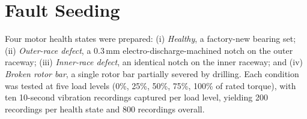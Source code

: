 \section{Fault Seeding}
Four motor health states were prepared: (i) \emph{Healthy}, a factory-new bearing set; (ii)
\emph{Outer-race defect}, a 0.3\,mm electro-discharge-machined notch on the outer raceway; (iii)
\emph{Inner-race defect}, an identical notch on the inner raceway; and (iv) \emph{Broken rotor
bar}, a single rotor bar partially severed by drilling. Each condition was tested at five load
levels (0\%, 25\%, 50\%, 75\%, 100\% of rated torque), with ten 10-second vibration recordings
captured per load level, yielding 200 recordings per health state and 800 recordings overall.

